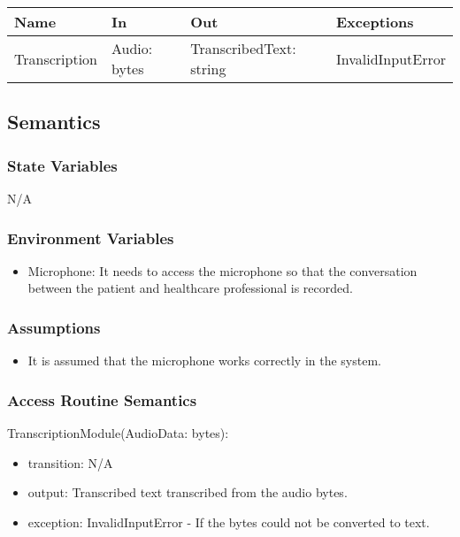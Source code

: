 \documentclass[12pt, titlepage]{article}
\begin{document}
\begin{center}
\begin{tabular}{p{2cm} p{4cm} p{4cm} p{2cm}}
\hline
\textbf{Name} & \textbf{In} & \textbf{Out} & \textbf{Exceptions} \\
\hline
Transcription & Audio: bytes & TranscribedText: string & InvalidInputError \\ 
\hline
\end{tabular}
\end{center}

\subsection{Semantics}

\subsubsection{State Variables}

N/A

\subsubsection{Environment Variables}

\begin{itemize}
  \item Microphone: It needs to access the microphone so that the conversation between the patient and healthcare professional is recorded.
\end{itemize}

\subsubsection{Assumptions}

\begin{itemize}
  \item It is assumed that the microphone works correctly in the system.
\end{itemize}

\subsubsection{Access Routine Semantics}

\noindent TranscriptionModule(AudioData: bytes):
\begin{itemize}
  \item transition: N/A
  \item output: Transcribed text transcribed from the audio bytes. 
  \item exception: InvalidInputError - If the bytes could not be converted to text. 
\end{itemize}
\end{document}
